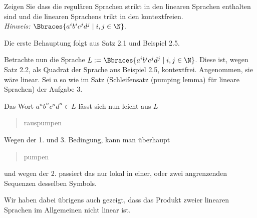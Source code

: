 
\begin{exercise}

Zeigen Sie dass die regulären Sprachen strikt in den linearen Sprachen enthalten sind und die linearen Sprachens trikt in den kontextfreien. \\

\textit{Hinweis: $\Bbraces{a^i b^i c^j d^j \mid i, j \in \N}$.}

\end{exercise}


\begin{solution}

Die erste Behauptung folgt aus Satz 2.1 und Beispiel 2.5.

Betrachte nun die Sprache $L := \Bbraces{a^i b^i c^j d^j \mid i, j \in \N}$.
Diese ist, wegen Satz 2.2, als Quadrat der Sprache aus Beispiel 2.5, kontextfrei.
Angenommen, sie wäre linear.
Sei $n$ so wie im Satz (Schleifensatz (pumping lemma) für lineare Sprachen) der Aufgabe 3.

Das Wort $a^n b^n c^n d^n \in L$ lässt sich nun leicht aus $L$ \blockquote{rauspumpen}.
Wegen der 1. und 3. Bedingung, kann man überhaupt \blockquote{pumpen};
und wegen der 2. passiert das nur lokal in einer, oder zwei angrenzenden Sequenzen desselben Symbols.

Wir haben dabei übrigens auch gezeigt, dass das Produkt zweier linearen Sprachen im Allgemeinen nicht linear ist.

\end{solution}

